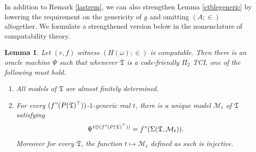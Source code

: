 \documentclass[12pt, twoside]{memoir}
\numberwithin{equation}{section}
\newtheorem{lem}[thm]{Lemma}
\theoremstyle{definition}
\theoremstyle{remark}
\theoremstyle{definition}
\theoremstyle{definition}
\theoremstyle{definition}
\theoremstyle{remark}
\begin{document}
In addition to Remark \ref{lastrem}, we can also strengthen Lemma \ref{ctblegeneric} by lowering the requirement on the genericity of $g$ and omitting $(A; \in)$ altogether. We formulate a strengthened version below in the nomenclature of computability theory.

\begin{lem}\label{ctblegeneric2}
Let $(r, f)$ witness $(H(\omega); \in)$ is computable. Then there is an oracle machine $\Psi$ such that whenever $\mathfrak{T}$ is a code-friendly $\Pi_2$ TCI, one of the following must hold.
\begin{enumerate}[label=(\arabic*)]
    \item All models of $\mathfrak{T}$ are almost finitely determined.
    \item\label{4532} For every $(f" (P(\mathfrak{T})^{\top}))$-$1$-generic real $t$, there is a unique model $\mathcal{M}_t$ of $\mathfrak{T}$ satisfying $$\Psi^{t \oplus (f" (P(\mathfrak{T})^{\top}))} = f" (\Sigma(\mathfrak{T}, \mathcal{M}_t)).$$ Moreover for every $\mathfrak{T}$, the function $t \mapsto \mathcal{M}_t$ defined as such is injective.
\end{enumerate}
\end{lem}
\end{document}
